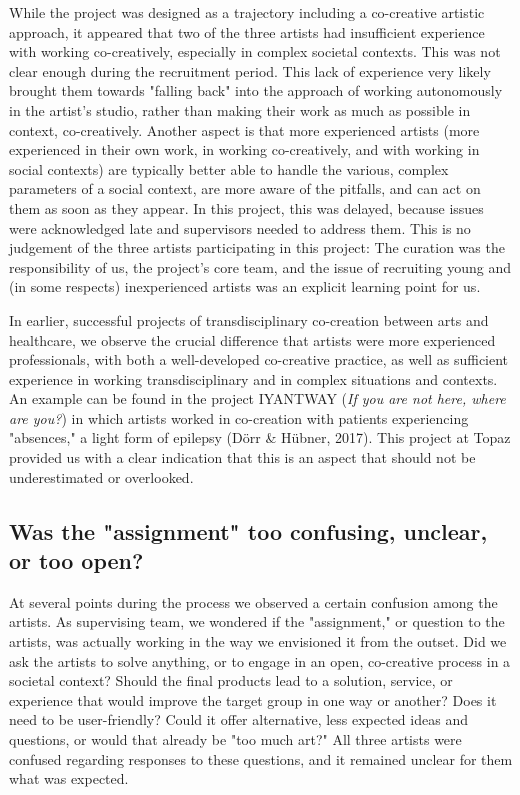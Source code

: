 \documentclass[authordate, empirical]{jote-new-article}
\begin{document}
{	While the project was designed as a trajectory including a co-creative artistic approach, it appeared that two of the three artists had insufficient experience with working co-creatively, especially in complex societal contexts. This was not clear enough during the recruitment period. This lack of experience very likely brought them towards "falling back" into the approach of working autonomously in the artist's studio, rather than making their work as much as possible in context, co-creatively. Another aspect is that more experienced artists (more experienced in their own work, in working co-creatively, and with working in social contexts) are typically better able to handle the various, complex parameters of a social context, are more aware of the pitfalls, and can act on them as soon as they appear. In this project, this was delayed, because issues were acknowledged late and supervisors needed to address them. This is no judgement of the three artists participating in this project: The curation was the responsibility of us, the project's core team, and the issue of recruiting young and (in some respects) inexperienced artists was an explicit learning point for us.

	

	

	In earlier, successful projects of transdisciplinary co-creation between arts and healthcare, we observe the crucial difference that artists were more experienced professionals, with both a well-developed co-creative practice, as well as sufficient experience in working transdisciplinary and in complex situations and contexts. An example can be found in the project IYANTWAY (\emph{If you are not here, where are you?}) in which artists worked in co-creation with patients experiencing "absences," a light form of epilepsy (Dörr \& Hübner, 2017). This project at Topaz provided us with a clear indication that this is an aspect that should not be underestimated or overlooked.


	

	\subsection{Was the "assignment" too confusing, unclear, or too open?}



	At several points during the process we observed a certain confusion among the artists. As supervising team, we wondered if the "assignment," or question to the artists, was actually working in the way we envisioned it from the outset. Did we ask the artists to solve anything, or to engage in an open, co-creative process in a societal context? Should the final products lead to a solution, service, or experience that would improve the target group in one way or another? Does it need to be user-friendly? Could it offer alternative, less expected ideas and questions, or would that already be "too much art?" All three artists were confused regarding responses to these questions, and it remained unclear for them what was expected.





}
\end{document}
